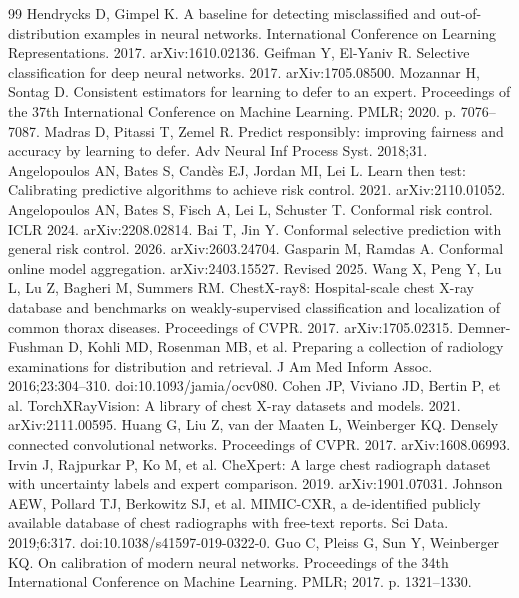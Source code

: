 \documentclass[10pt,a4paper]{article}
\begin{document}
\begin{thebibliography}{99}
Hendrycks D, Gimpel K. A baseline for detecting misclassified and out-of-distribution examples in neural networks. International Conference on Learning Representations. 2017. arXiv:1610.02136.
Geifman Y, El-Yaniv R. Selective classification for deep neural networks. 2017. arXiv:1705.08500.
Mozannar H, Sontag D. Consistent estimators for learning to defer to an expert. Proceedings of the 37th International Conference on Machine Learning. PMLR; 2020. p. 7076--7087.
Madras D, Pitassi T, Zemel R. Predict responsibly: improving fairness and accuracy by learning to defer. Adv Neural Inf Process Syst. 2018;31.
 Angelopoulos AN, Bates S, Cand\`es EJ, Jordan MI, Lei L. Learn then test: Calibrating predictive algorithms to achieve risk control. 2021. arXiv:2110.01052.
 Angelopoulos AN, Bates S, Fisch A, Lei L, Schuster T. Conformal risk control. ICLR 2024. arXiv:2208.02814.
 Bai T, Jin Y. Conformal selective prediction with general risk control. 2026. arXiv:2603.24704.
 Gasparin M, Ramdas A. Conformal online model aggregation. arXiv:2403.15527. Revised 2025.
 Wang X, Peng Y, Lu L, Lu Z, Bagheri M, Summers RM. ChestX-ray8: Hospital-scale chest X-ray database and benchmarks on weakly-supervised classification and localization of common thorax diseases. Proceedings of CVPR. 2017. arXiv:1705.02315.
 Demner-Fushman D, Kohli MD, Rosenman MB, et al. Preparing a collection of radiology examinations for distribution and retrieval. J Am Med Inform Assoc. 2016;23:304--310. doi:10.1093/jamia/ocv080.
 Cohen JP, Viviano JD, Bertin P, et al. TorchXRayVision: A library of chest X-ray datasets and models. 2021. arXiv:2111.00595.
 Huang G, Liu Z, van der Maaten L, Weinberger KQ. Densely connected convolutional networks. Proceedings of CVPR. 2017. arXiv:1608.06993.
 Irvin J, Rajpurkar P, Ko M, et al. CheXpert: A large chest radiograph dataset with uncertainty labels and expert comparison. 2019. arXiv:1901.07031.
 Johnson AEW, Pollard TJ, Berkowitz SJ, et al. MIMIC-CXR, a de-identified publicly available database of chest radiographs with free-text reports. Sci Data. 2019;6:317. doi:10.1038/s41597-019-0322-0.
Guo C, Pleiss G, Sun Y, Weinberger KQ. On calibration of modern neural networks. Proceedings of the 34th International Conference on Machine Learning. PMLR; 2017. p. 1321--1330.

\end{thebibliography}
\end{document}
